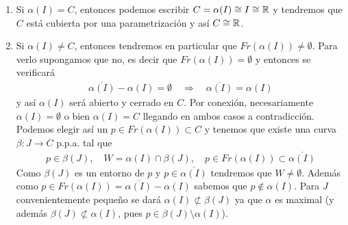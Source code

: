 \begin{observacion}
\begin{enumerate}
        \begin{enumerate}
            \item Si $\alpha(I)=C$, entonces podemos escribir $C=\alpha(I)\cong I \cong \mathbb{R}$ y tendremos que $C$ está cubierta por una parametrización y así $C\cong \mathbb{R}$.
            \item Si $\alpha(I)\neq C$, entonces tendremos en particular que $Fr(\alpha(I))\neq \emptyset$. Para verlo supongamos que no, es decir que $Fr(\alpha(I))=\emptyset$ y entonces se verificará
            \begin{gather*}
                \overline{\alpha(I)} - \alpha(I) =\emptyset \quad \Rightarrow \quad \overline{\alpha(I)} = \alpha(I)
            \end{gather*}
            y así $\alpha(I)$ será abierto y cerrado en $C$. Por conexión, necesariamente $\alpha(I)=\emptyset$ o bien $\alpha(I)=C$ llegando en ambos casos a contradicción. \\

            Podemos elegir así un $p\in Fr(\alpha(I)) \subset C$ y tenemos que existe una curva $\beta:J\to C$ p.p.a. tal que 
            \begin{gather*}
                p\in \beta(J), \quad W=\alpha(I)\cap \beta(J), \quad p\in Fr(\alpha(I))\subset \overline{\alpha(I)}
            \end{gather*}
            Como $\beta(J)$ es un entorno de $p$ y $p\in \overline{\alpha(I)}$ tendremos que $W\neq \emptyset$. Además como $p\in Fr(\alpha(I))=\overline{\alpha(I)} - \alpha(I)$ sabemos que $p\notin \alpha(I)$. Para $J$ convenientemente pequeño se dará $\alpha(I)\not\subset \beta(J)$ ya que $\alpha$ es maximal (y además $\beta(J)\not\subset\alpha(I)$, pues $p\in\beta(J)\setminus\alpha(I)$).

            \begin{figure}[H]
                \centering
                \begin{subfigure}[c]{0.60\textwidth}
                    \centering
\end{subfigure}
\end{figure}
\end{enumerate}
\end{enumerate}
\end{observacion}
